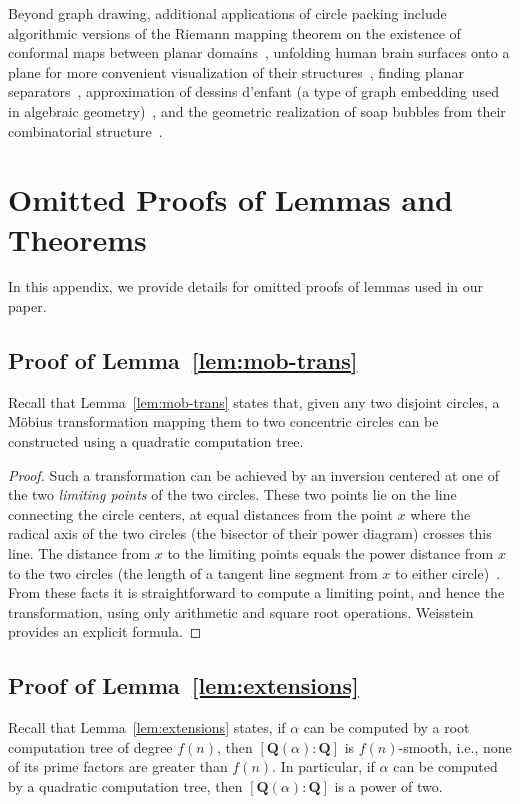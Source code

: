 \documentclass[oribibl,10pt]{llncs}
\newcommand{\rationals}{\mathbf{Q}}
\begin{document}
\begin{appendix}
Beyond graph drawing, additional applications of circle packing include algorithmic versions of the Riemann mapping theorem on the existence of conformal maps between planar domains~, unfolding human brain surfaces onto a plane for more convenient visualization of their structures~,
finding planar separators~,
approximation of dessins d'enfant (a type of graph embedding used in algebraic geometry)~,
and the geometric realization of soap bubbles from their combinatorial structure~.

\clearpage
\section{Omitted Proofs of Lemmas and Theorems}
\label{app:proofs}
In this appendix, we provide details for omitted proofs of lemmas used in our
paper.

\subsection{Proof of Lemma~\ref{lem:mob-trans}}

Recall that Lemma~\ref{lem:mob-trans} states that, given any two disjoint circles, a M\"{o}bius transformation mapping them to two concentric circles can be constructed using a quadratic computation tree.

\begin{proof}
Such a transformation can be achieved by an inversion centered at one of the two \emph{limiting points} of the two circles. These two points lie on the line connecting the circle centers, at equal distances from the point $x$ where the radical axis of the two circles (the bisector of their power diagram) crosses this line. The distance from $x$ to the limiting points equals the power distance from $x$ to the two circles (the length of a tangent line segment from $x$ to either circle)~. From these facts it is straightforward to compute a limiting point, and hence the transformation, using only arithmetic and square root operations. Weisstein~ provides an explicit formula.
\end{proof}

\subsection{Proof of Lemma~\ref{lem:extensions}}
Recall that Lemma~\ref{lem:extensions} states,
if $\alpha$ can be computed by a root computation tree of degree $f(n)$, then $[\rationals(\alpha):\rationals]$ is $f(n)$-smooth, i.e., none of its prime factors are greater than $f(n)$. In particular, if $\alpha$ can be computed by a quadratic computation tree, then $[\rationals(\alpha):\rationals]$ is a power of two.


\end{appendix}
\end{document}
